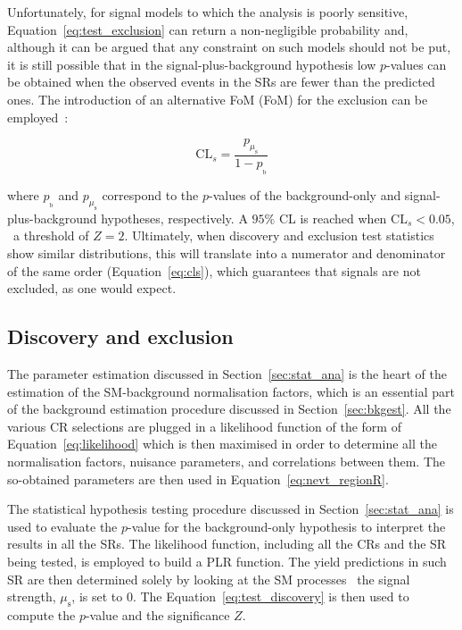 			Unfortunately, for signal models to which the analysis is poorly sensitive, Equation~\ref{eq:test_exclusion} can return a non-negligible probability and, although it can be argued that any constraint on such models should not be put, it is still possible that in the signal-plus-background hypothesis low $p$-values can be obtained when the observed events in the \acp{SR} are fewer than the predicted ones. The introduction of an alternative \acl{FoM} (FoM) for the exclusion can be employed~\cite{Read:2002hq}:

			\begin{equation}
				\mathrm{CL}_s = \frac{p_{\mu_{\mathrm{s}}}} {1 - p_{_\mathrm{b}}}
			\label{eq:cls}
			\end{equation}

			\noindent where $p_{_\mathrm{b}}$ and $p_{\mu_{\mathrm{s}}}$ correspond to the $p$-values of the background-only and signal-plus-background hypotheses, respectively. A $95\%$ \ac{CL} is reached when $\mathrm{CL}_s < 0.05$, \ie\ a threshold of $Z = 2$. Ultimately, when discovery and exclusion test statistics show similar distributions, this will translate into a numerator and denominator of the same order (Equation~\ref{eq:cls}), which guarantees that signals are not excluded, as one would expect.


			\subsection{Discovery and exclusion}

				The parameter estimation discussed in Section~\ref{sec:stat_ana} is the heart of the estimation of the \ac{SM}-background normalisation factors, which is an essential part of the background estimation procedure discussed in Section~\ref{sec:bkgest}. All the various \ac{CR} selections are plugged in a likelihood function of the form of Equation~\ref{eq:likelihood} which is then maximised in order to determine all the normalisation factors, nuisance parameters, and correlations between them. The so-obtained parameters are then used in Equation~\ref{eq:nevt_regionR}. 

				The statistical hypothesis testing procedure discussed in Section~\ref{sec:stat_ana} is used to evaluate the $p$-value for the background-only hypothesis to interpret the results in all the \acp{SR}. The likelihood function, including all the \acp{CR} and the \ac{SR} being tested, is employed to build a \ac{PLR} function. The yield predictions in such \ac{SR} are then determined solely by looking at the \ac{SM} processes \ie\ the signal strength, $\mu_{\mathrm{s}}$, is set to $0$. The Equation~\ref{eq:test_discovery} is then used to compute the $p$-value and the significance $Z$.%

